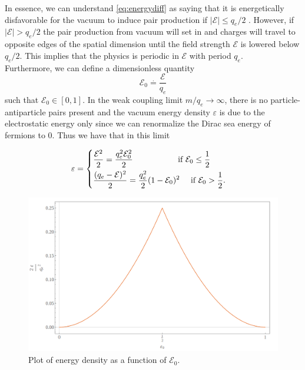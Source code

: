 In essence, we can understand \eqref{eq:energydiff} as saying that it is energetically disfavorable for the vacuum to induce pair production if $|\mathcal{E}|\leq q_e/2$ . However, if $|\mathcal{E}|>q_e/2 $ the pair production from vacuum will set in and charges will travel to opposite edges of the spatial dimension until the field strength $\mathcal{E}$ is lowered below $q_e/2$.  This implies that the physics is periodic in $\mathcal{E}$ with period $q_e$.\\

Furthermore, we can define a dimensionless quantity  $$\mathcal{E}_0\overset{.}{=}\frac{\mathcal{E}}{q_e}$$ such that $\mathcal{E}_0\in[0,1]$. In the weak coupling limit $m/q_e\to\infty$, there is no particle-antiparticle pairs present and the vacuum energy density $\varepsilon$ is due to the electrostatic energy only since we can renormalize the Dirac sea energy of fermions to 0. Thus we have that in this limit

\begin{equation}
\varepsilon = 
\begin{dcases}
\frac{\mathcal{E}^2}{2} = \frac{q_e^2\mathcal{E}_0^2}{2}\quad \quad\quad\quad\quad\,\text{ if } \mathcal{E}_0\leq \frac{1}{2}& \\ \frac{(q_e-\mathcal{E})^2}{2} = \frac{q_e^2}{2}(1 - \mathcal{E}_0)^2\quad \text{ if } \mathcal{E}_0> \frac{1}{2}.
\end{dcases}
\end{equation}

\begin{figure}[htb]
	\centering
	\includegraphics[scale=0.35]{figures/discont.png}
	\caption{Plot of energy density as a function of $\mathcal{E}_0$.}
	\label{fig:background}
\end{figure}

